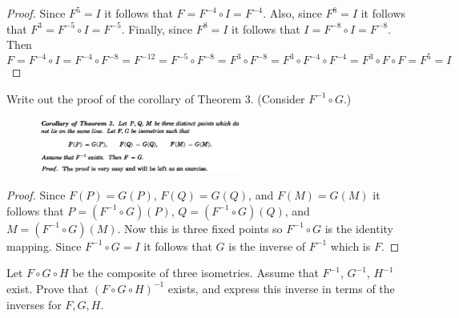 \begin{proof}
    Since $F^5 = I$ it follows that $F = F^{-4} \circ I = F^{-4}$.
    Also, since $F^8 = I$ it follows that $F^3 = F^{-5} \circ I = F^{-5}$.
    Finally, since $F^8 = I$ it follows that $I = F^{-8} \circ I = F^{-8}$.
    Then
    \[F = F^{-4} \circ I  = F^{-4} \circ F^{-8} = F^{-12} = F^{-5} \circ F^{-8} = F^3 \circ F^{-8}  = F^3 \circ F^{-4} \circ F^{-4} = F^3 \circ F \circ F = F^5 = I \]
\end{proof}

\begin{tcolorbox}[title=Problem 5, breakable]
    Write out the proof of the corollary of Theorem $3$. (Consider $F^{-1} \circ G$.)
\end{tcolorbox}

\begin{figure}[h]
    \centering
    \includegraphics[width=0.6\textwidth]{images/coral.png}
\end{figure}

\begin{proof}
    Since $F(P) = G(P)$, $F(Q) = G(Q)$, and $F(M) = G(M)$
        it follows that $P = (F^{-1} \circ G)(P)$, $Q = (F^{-1} \circ G)(Q)$, and $M = (F^{-1} \circ G)(M)$.
    Now this is three fixed points so $F^{-1} \circ G$ is the identity mapping.
    Since $F^{-1} \circ G = I$ it follows that $G$ is the inverse of $F^{-1}$ which is $F$.
\end{proof}

\begin{tcolorbox}[title=Problem 6, breakable]
    Let $F \circ G \circ H$ be the composite of three isometries.
    Assume that $F^{-1}$, $G^{-1}$, $H^{-1}$ exist.
    Prove that $(F \circ G \circ H)^{-1}$ exists, and express this 
    inverse in terms of the inverses for $F, G, H$.
\end{tcolorbox}

